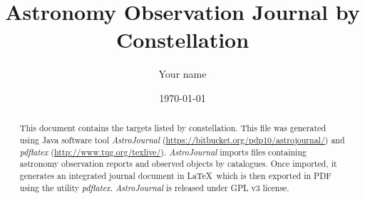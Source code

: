\documentclass[10pt,twoside,a4paper,english]{article}
\title{Astronomy Observation Journal by Constellation}
\author{Your name}
\date{\today}
\begin{document}
\maketitle
\thispagestyle{empty}

\begin{abstract}
This document contains the targets listed by constellation. This file was generated using Java software tool {\it AstroJournal} (\href{https://bitbucket.org/pdp10/astrojournal/}{https://bitbucket.org/pdp10/astrojournal/}) and {\it pdflatex} (\href{http://www.tug.org/texlive/}{http://www.tug.org/texlive/}). {\it AstroJournal} imports files containing astronomy observation reports and observed objects by catalogues. Once imported, it generates an integrated journal document in \LaTeX\ which is then exported in PDF using the utility {\it pdflatex}. {\it AstroJournal} is released under GPL v3 license.
\end{abstract}


\tableofcontents

\clearpage
{}


\small
%
\clearpage


\small
\end{document}
